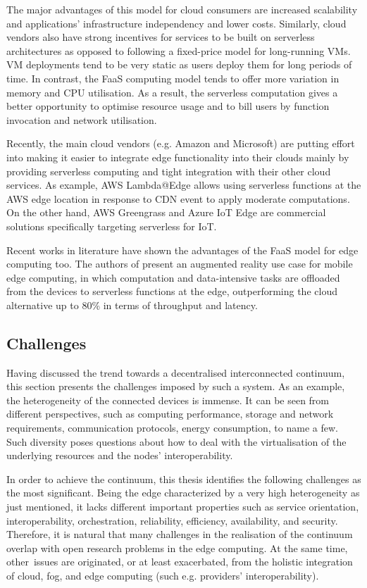 \documentclass{ieeeaccess}
\begin{document}
The major advantages of this model for cloud consumers are increased scalability and applications' infrastructure independency and lower costs. Similarly, cloud vendors also have strong incentives for services to be built on serverless architectures as opposed to following a fixed-price model for long-running VMs. VM deployments tend to be very static as users deploy them for long periods of time. In contrast, the FaaS computing model tends to offer more variation in memory and CPU utilisation. As a result, the serverless computation gives a better opportunity to optimise resource usage and to bill users by function invocation and network utilisation.

Recently, the main cloud vendors (e.g. Amazon and Microsoft) are putting effort into making it easier to integrate edge functionality into their clouds mainly by providing serverless computing and tight integration with their other cloud services. As example, AWS Lambda@Edge \cite{aws-lambda-edge} allows using serverless functions at the AWS edge location in response to CDN event to apply moderate computations. On the other hand, AWS Greengrass \cite{aws-greengrass} and Azure IoT Edge \cite{azure-iot-edge} are commercial solutions specifically targeting serverless for IoT.

Recent works in literature have shown the advantages of the FaaS model for edge computing too. The authors of \cite{serverless-mec} present an augmented reality use case for mobile edge computing, in which computation and data-intensive tasks are offloaded from the devices to serverless functions at the edge, outperforming the cloud alternative up to 80\% in terms of throughput and latency.

\subsection{Challenges}

Having discussed the trend towards a decentralised interconnected continuum, this section presents the challenges imposed by such a system. As an example, the heterogeneity of the connected devices is immense. It can be seen from different perspectives, such as computing performance, storage and network requirements, communication protocols, energy consumption, to name a few. Such diversity poses questions about how to deal with the virtualisation of the underlying resources and the nodes' interoperability.

In order to achieve the continuum, this thesis identifies the following challenges as the most significant. Being the edge characterized by a very high heterogeneity as just mentioned, it lacks different important properties such as service orientation, interoperability, orchestration, reliability, efficiency, availability, and security. Therefore, it is natural that many challenges in the realisation of the continuum overlap with open research problems in the edge computing. At the same time, other issues are originated, or at least exacerbated, from the holistic integration of cloud, fog, and edge computing (such e.g. providers' interoperability).
\end{document}
